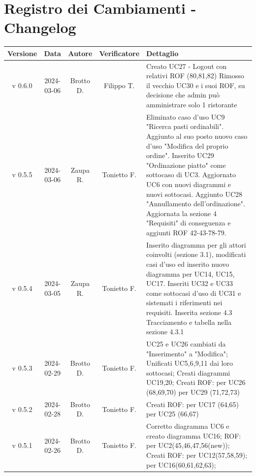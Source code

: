 \documentclass[12pt, oneside]{article}
\begin{document}
\section*{Registro dei Cambiamenti - Changelog}
\begin{longtable}{|c|c|c|c|p{7cm}|}
\hline
\textbf{Versione} & \textbf{Data} & \textbf{Autore} & \textbf{Verificatore} & 
\textbf{Dettaglio} \\
\hline
v 0.6.0 & 2024-03-06 & Brotto D. & Filippo T. & Creato UC27 - Logout con relativi ROF (80,81,82) 
\newline Rimosso il vecchio UC30 e i suoi ROF, su decisione che admin può amministrare solo 1 ristorante
\\
\hline
v 0.5.5 & 2024-03-06 & Zaupa R. & Tonietto F. & Eliminato caso d'uso UC9 "Ricerca pasti ordinabili". Aggiunto al suo posto nuovo caso d'uso "Modifica del proprio ordine". Inserito UC29 "Ordinazione piatto" come sottocaso di UC3. Aggiornato UC6 con nuovi diagrammi e nuovi sottocasi. Aggiunto UC28 "Annullamento dell'ordinazione". Aggiornata la sezione 4 "Requisiti" di conseguenza e aggiunti ROF 42-43-78-79. \\
\hline
v 0.5.4 & 2024-03-05 & Zaupa R. & Tonietto F. & Inserito diagramma per gli attori coinvolti (sezione 3.1), modificati casi d'uso ed inserito nuovo diagramma per UC14, UC15, UC17. Inseriti UC32 e UC33 come sottocasi d'uso di UC31 e sistemati i riferimenti nei requisiti. Inserita sezione 4.3 Tracciamento e tabella nella sezione 4.3.1\\
\hline
v 0.5.3 & 2024-02-29 & Brotto D. & Tonietto F. & UC25 e UC26 cambiati da "Inserimento" a "Modifica";
\newline Unificati UC5,6,9,11 dai loro sottocasi;
\newline Creati diagrammi UC19,20;
\newline Creati ROF:
\newline per UC26 (68,69,70)
\newline per UC29 (71,72,73)
\\
\hline
v 0.5.2 & 2024-02-28 & Brotto D. & Tonietto F. & Creati ROF:
\newline per UC17 (64,65) 
\newline per UC25 (66,67)
\\
\hline
v 0.5.1 & 2024-02-26 & Brotto D. & Tonietto F. & Corretto diagramma UC6 e creato diagramma UC16; \newline ROF: per UC2(45,46,47,56(new)); 
\newline Creati ROF: \newline per UC12(57,58,59); \newline per UC16(60,61,62,63); \\

\end{longtable}
\end{document}
